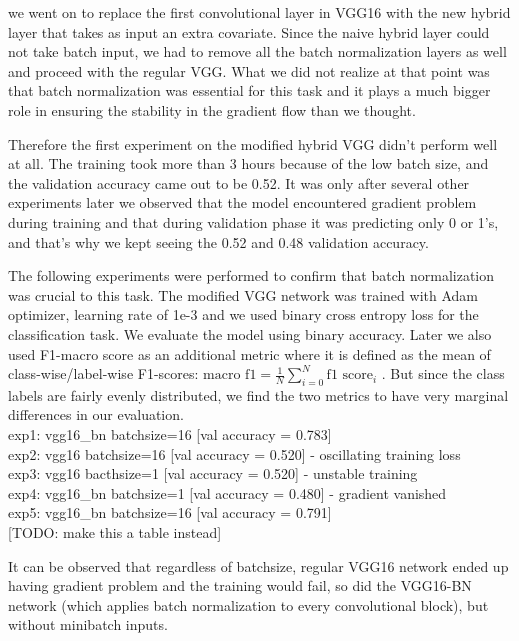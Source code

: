 \documentclass[12pt]{article}
\begin{document}
we went on to replace the first convolutional layer in VGG16 with the new hybrid layer that takes as input an extra covariate. Since the naive hybrid layer could not take batch input, we had to remove all the batch normalization layers as well and proceed with the regular VGG. What we did not realize at that point was that batch normalization was essential for this task and it plays a much bigger role in ensuring the stability in the gradient flow than we thought. 

Therefore the first experiment on the modified hybrid VGG didn't perform well at all. The training took more than 3 hours because of the low batch size, and the validation accuracy came out to be 0.52. It was only after several other experiments later we observed that the model encountered gradient problem during training and that during validation phase it was predicting only 0 or 1's, and that's why we kept seeing the 0.52 and 0.48 validation accuracy.

The following experiments were performed to confirm that batch normalization was crucial to this task. The modified VGG network was trained with Adam optimizer, learning rate of 1e-3 and we used binary cross entropy loss for the classification task. We evaluate the model using binary accuracy. Later we also used F1-macro score as an additional metric where it is defined as the mean of class-wise/label-wise F1-scores: $ \text{macro f1} = \frac{1}{N} \sum^N_{i=0} \text{f1 score}_i$ . But since the class labels are fairly evenly distributed, we find the two metrics to have very marginal differences in our evaluation.  \\

\noindent exp1: vgg16\_bn batchsize=16 [val accuracy = 0.783]  \\
exp2: vgg16 batchsize=16 [val accuracy = 0.520] - oscillating training loss \\
exp3: vgg16 bacthsize=1 [val accuracy = 0.520] - unstable training \\
exp4: vgg16\_bn batchsize=1 [val accuracy = 0.480] - gradient vanished \\
exp5: vgg16\_bn batchsize=16 [val accuracy = 0.791] \\

[TODO: make this a table instead]

It can be observed that regardless of batchsize, regular VGG16 network ended up having gradient problem and the training would fail, so did the VGG16-BN network (which applies batch normalization to every convolutional block), but without minibatch inputs. 
\end{document}
